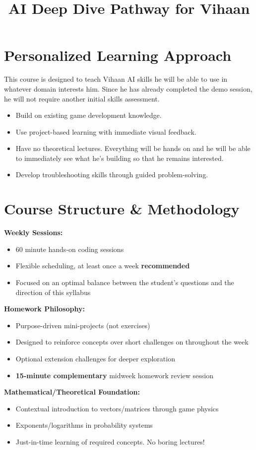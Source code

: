 \documentclass{article}
\title{\vspace{-2em}AI Deep Dive Pathway for Vihaan\vspace{-2em}}
\author{}
\date{}
\begin{document}
\fontsize{13}{15}\selectfont
\maketitle

\section{Personalized Learning Approach}
This course is designed to teach Vihaan AI skills he will be able to use in whatever domain interests him. Since he has already completed the demo session, he will not require another initial skills assessment. 

\begin{itemize}[leftmargin=*, noitemsep]
    \item Build on existing game development knowledge.
    \item Use project-based learning with immediate visual feedback.
    \item Have no theoretical lectures. Everything will be hands on and he will be able to immediately see what he's building so that he remains interested.
    \item Develop troubleshooting skills through guided problem-solving.
\end{itemize}

\section{Course Structure \& Methodology}
\begin{learningblock}
\textbf{Weekly Sessions:} 
\begin{itemize}[noitemsep]
\item 60 minute hands-on coding sessions 
\item Flexible scheduling, at least once a week \textbf{recommended}
\item Focused on an optimal balance between the student's questions and the direction of this syllabus
\end{itemize}

\textbf{Homework Philosophy:}
\begin{itemize}[noitemsep]
\item Purpose-driven mini-projects (not exercises)
\item Designed to reinforce concepts over short challenges on throughout the week
\item Optional extension challenges for deeper exploration
\item \textbf{15-minute complementary} midweek homework review session
\end{itemize}

\textbf{Mathematical/Theoretical Foundation:}
\begin{itemize}[noitemsep]
\item Contextual introduction to vectors/matrices through game physics
\item Exponents/logarithms in probability systems
\item Just-in-time learning of required concepts. No boring lectures!
\end{itemize}
\end{learningblock}
\end{document}
